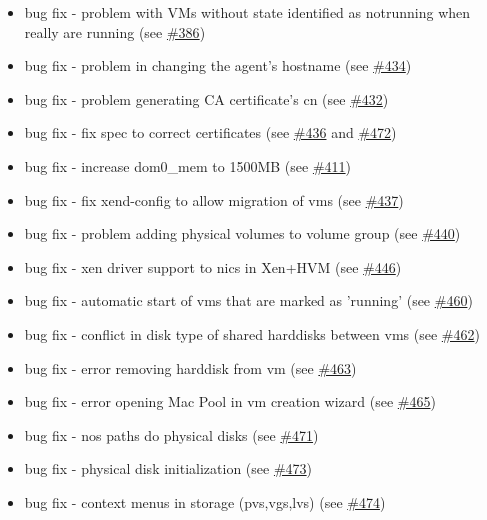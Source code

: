 \begin{itemize}
\item bug fix - problem with VMs without state identified as notrunning when really are running (see \href{https://srcmaster.eurotux.com/pm/p/etva/ticket/386}{\#386})
\item bug fix - problem in changing the agent's hostname (see \href{https://srcmaster.eurotux.com/pm/p/etva/ticket/434}{\#434})
\item bug fix - problem generating CA certificate's cn (see \href{https://srcmaster.eurotux.com/pm/p/etva/ticket/432}{\#432})
\item bug fix - fix spec to correct certificates (see \href{https://srcmaster.eurotux.com/pm/p/etva/ticket/436}{\#436} and \href{https://srcmaster.eurotux.com/pm/p/etva/ticket/472}{\#472})
\item bug fix - increase dom0\_mem to 1500MB (see \href{https://srcmaster.eurotux.com/pm/p/etva/ticket/411}{\#411})
\item bug fix - fix xend-config to allow migration of vms (see \href{https://srcmaster.eurotux.com/pm/p/etva/ticket/437}{\#437})
\item bug fix - problem adding physical volumes to volume group (see \href{https://srcmaster.eurotux.com/pm/p/etva/ticket/440}{\#440})
\item bug fix - xen driver support to nics in Xen+HVM (see \href{https://srcmaster.eurotux.com/pm/p/etva/ticket/446}{\#446})
\item bug fix - automatic start of vms that are marked as 'running' (see \href{https://srcmaster.eurotux.com/pm/p/etva/ticket/460}{\#460})
\item bug fix - conflict in disk type of shared harddisks between vms (see \href{https://srcmaster.eurotux.com/pm/p/etva/ticket/462}{\#462})
\item bug fix - error removing harddisk from vm (see \href{https://srcmaster.eurotux.com/pm/p/etva/ticket/463}{\#463})
\item bug fix - error opening Mac Pool in vm creation wizard (see \href{https://srcmaster.eurotux.com/pm/p/etva/ticket/465}{\#465})
\item bug fix - nos paths do physical disks (see \href{https://srcmaster.eurotux.com/pm/p/etva/ticket/471}{\#471})
\item bug fix - physical disk initialization (see \href{https://srcmaster.eurotux.com/pm/p/etva/ticket/473}{\#473})
\item bug fix - context menus in storage (pvs,vgs,lvs) (see \href{https://srcmaster.eurotux.com/pm/p/etva/ticket/474}{\#474})

\end{itemize}
